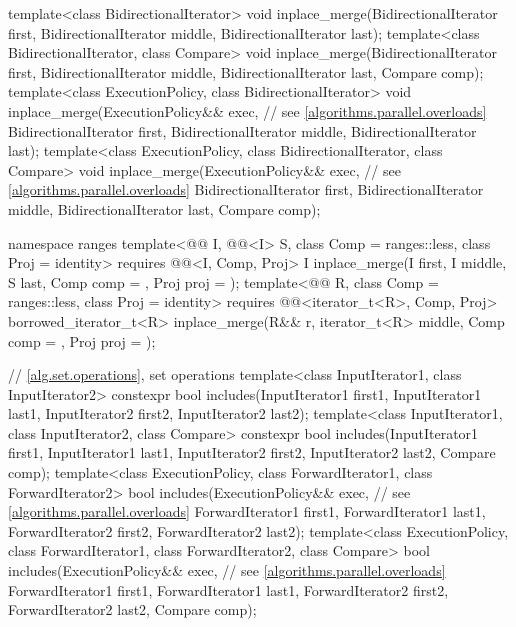 \begin{codeblock}
{  template<class BidirectionalIterator>
    void inplace_merge(BidirectionalIterator first,
                       BidirectionalIterator middle,
                       BidirectionalIterator last);
  template<class BidirectionalIterator, class Compare>
    void inplace_merge(BidirectionalIterator first,
                       BidirectionalIterator middle,
                       BidirectionalIterator last, Compare comp);
  template<class ExecutionPolicy, class BidirectionalIterator>
    void inplace_merge(ExecutionPolicy&& exec,                  // see \ref{algorithms.parallel.overloads}
                       BidirectionalIterator first,
                       BidirectionalIterator middle,
                       BidirectionalIterator last);
  template<class ExecutionPolicy, class BidirectionalIterator, class Compare>
    void inplace_merge(ExecutionPolicy&& exec,                  // see \ref{algorithms.parallel.overloads}
                       BidirectionalIterator first,
                       BidirectionalIterator middle,
                       BidirectionalIterator last, Compare comp);

  namespace ranges {
    template<@@ I, @@<I> S, class Comp = ranges::less,
             class Proj = identity>
      requires @@<I, Comp, Proj>
      I inplace_merge(I first, I middle, S last, Comp comp = {}, Proj proj = {});
    template<@@ R, class Comp = ranges::less, class Proj = identity>
      requires @@<iterator_t<R>, Comp, Proj>
      borrowed_iterator_t<R>
        inplace_merge(R&& r, iterator_t<R> middle, Comp comp = {},
                      Proj proj = {});
  }

  // \ref{alg.set.operations}, set operations
  template<class InputIterator1, class InputIterator2>
    constexpr bool includes(InputIterator1 first1, InputIterator1 last1,
                            InputIterator2 first2, InputIterator2 last2);
  template<class InputIterator1, class InputIterator2, class Compare>
    constexpr bool includes(InputIterator1 first1, InputIterator1 last1,
                            InputIterator2 first2, InputIterator2 last2,
                            Compare comp);
  template<class ExecutionPolicy, class ForwardIterator1, class ForwardIterator2>
    bool includes(ExecutionPolicy&& exec,                       // see \ref{algorithms.parallel.overloads}
                  ForwardIterator1 first1, ForwardIterator1 last1,
                  ForwardIterator2 first2, ForwardIterator2 last2);
  template<class ExecutionPolicy, class ForwardIterator1, class ForwardIterator2,
           class Compare>
    bool includes(ExecutionPolicy&& exec,                       // see \ref{algorithms.parallel.overloads}
                  ForwardIterator1 first1, ForwardIterator1 last1,
                  ForwardIterator2 first2, ForwardIterator2 last2,
                  Compare comp);

}
\end{codeblock}
